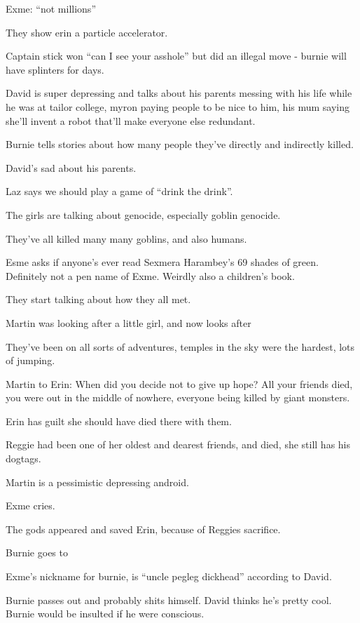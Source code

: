 Exme: “not millions”\medskip

They show erin a particle accelerator.\medskip

Captain stick won “can I see your asshole” but did an illegal move - burnie will have splinters for days.\medskip

David is super depressing and talks about his parents messing with his life while he was at tailor college, myron paying people to be nice to him, his mum saying she’ll invent a robot that’ll make everyone else redundant.\medskip

Burnie tells stories about how many people they’ve directly and indirectly killed.\medskip

David’s sad about his parents.\medskip

Laz says we should play a game of “drink the drink”.\medskip

The girls are talking about genocide, especially goblin genocide.\medskip

They’ve all killed many many goblins, and also humans.\medskip

Esme asks if anyone’s ever read Sexmera Harambey’s 69 shades of green. Definitely not a pen name of Exme. Weirdly also a children’s book.\medskip

They start talking about how they all met.\medskip

Martin was looking after a little girl, and now looks after\medskip

They’ve been on all sorts of adventures, temples in the sky were the hardest, lots of jumping.\medskip

Martin to Erin: When did you decide not to give up hope? All your friends died, you were out in the middle of nowhere, everyone being killed by giant monsters.\medskip

Erin has guilt she should have died there with them.\medskip

Reggie had been one of her oldest and dearest friends, and died, she still has his dogtags.\medskip

Martin is a pessimistic depressing android.\medskip

Exme cries.\medskip

The gods appeared and saved Erin, because of Reggies sacrifice.\medskip

Burnie goes to\medskip

Exme’s nickname for burnie, is “uncle pegleg dickhead” according to David.\medskip

Burnie passes out and probably shits himself. David thinks he’s pretty cool. Burnie would be insulted if he were conscious.\medskip

